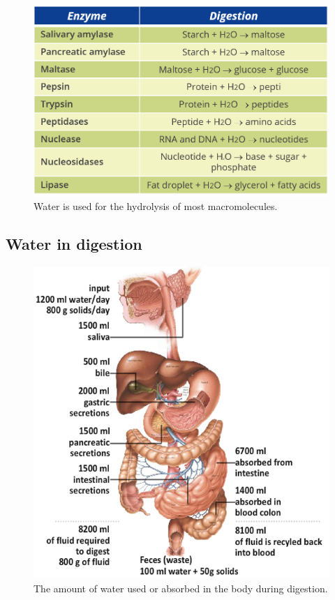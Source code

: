 \documentclass[11pt]{article}
\begin{document}
\begin{figure}[htbp]
\centering
\includegraphics[width=.9\linewidth]{./images/hydrolysis-table.png}
\caption{Water is used for the hydrolysis of most macromolecules.}
\end{figure}

\newpage
\subsection{Water in digestion}
\label{sec:orgd11de9f}

\begin{figure}[htbp]
\centering
\includegraphics[width=.9\linewidth]{./images/water-during-digestion.png}
\caption{The amount of water used or absorbed in the body during digestion.}
\end{figure}
\end{document}
